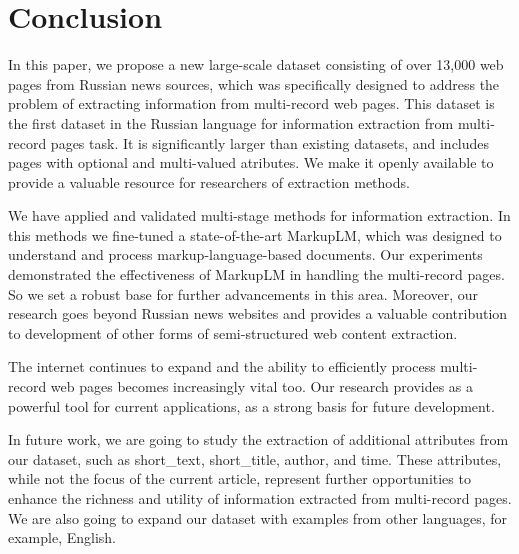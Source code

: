\section{Conclusion}

In this paper, we propose a new large-scale dataset consisting of over 13,000 web pages from Russian news sources, which was specifically designed to address the problem of extracting information from multi-record web pages. This dataset is the first dataset in the Russian language for information extraction from multi-record pages task. It is significantly larger than existing datasets, and includes pages with optional and multi-valued atributes. We make it openly available to provide a valuable resource for researchers of extraction methods.

We have applied and validated multi-stage methods for information extraction. In this methods we fine-tuned a state-of-the-art MarkupLM, which was designed to understand and process markup-language-based documents. Our experiments demonstrated the effectiveness of MarkupLM in handling the multi-record pages. So we set a robust base for further advancements in this area. Moreover, our research goes beyond Russian news websites and provides a valuable contribution to development of other forms of semi-structured web content extraction. 

The internet continues to expand and the ability to efficiently process multi-record web pages becomes increasingly vital too. Our research provides as a powerful tool for current applications, as a strong basis for future development.

In future work, we are going to study the extraction of additional attributes from our dataset, such as short\_text, short\_title, author, and time. These attributes, while not the focus of the current article, represent further opportunities to enhance the richness and utility of information extracted from multi-record pages. We are also going to expand our dataset with examples from other languages, for example, English.
